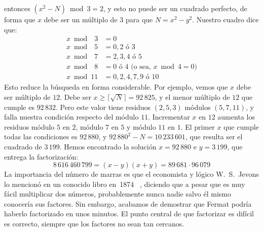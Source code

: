   entonces \((x^2 - N) \bmod 3 = 2\),
  y esto no puede ser un cuadrado perfecto,
  de forma que \(x\) debe ser un múltiplo de \(3\)
  para que \(N = x^2 - y^2\).
  Nuestro cuadro dice que:
  \begin{align*}
    x \bmod \phantom{0}3
      &= 0 \\
    x \bmod \phantom{0}5
      &= 0, 2 \text{\ ó\ } 3 \\
    x \bmod \phantom{0}7
      &= 2, 3, 4 \text{\ ó\ } 5 \\
    x \bmod \phantom{0}8
      &= 0 \text{\ ó\ } 4 \text{\ (o sea, \(x \bmod 4 = 0\))} \\
    x \bmod 11
      &= 0, 2, 4, 7, 9 \text{\ ó\ } 10
  \end{align*}
  Esto reduce la búsqueda en forma considerable.
  Por ejemplo,
  vemos que \(x\) debe ser múltiplo de \(12\).
  Debe ser \(x \ge \lceil \sqrt{N} \rceil = 92\,825\),
  y el menor múltiplo de \(12\) que cumple es \(92\,832\).
  Pero este valor
  tiene residuos \((2, 5, 3)\) módulos \((5, 7, 11)\),
  y falla nuestra condición respecto del módulo \(11\).
  Incrementar \(x\) en \(12\) aumenta los residuos
  módulo \(5\) en \(2\),
  módulo \(7\) en \(5\)
  y módulo \(11\) en \(1\).
  El primer \(x\) que cumple todas las condiciones es \(92\,880\),
  y \(92\,880^2 - N = 10\,233\,601\),
  que resulta ser el cuadrado de \(3\,199\).
  Hemos encontrado la solución \(x = 92\,880\) e \(y = 3\,199\),
  que entrega la factorización:
  \begin{equation*}
    8\,616\,460\,799 = (x - y) (x + y) = 89\,681 \cdot 96\,079
  \end{equation*}
  La importancia del número de marras
  es que el economista y lógico W.~S.~Jevons%
  lo mencionó en un conocido libro en~1874~%
    \cite{jevons74:_princ_scien},
  diciendo que a pesar que es muy fácil multiplicar dos números,
  probablemente nunca nadie salvo él mismo conocería sus factores.
  Sin embargo,
  acabamos de demostrar
  que Fermat%
  podría haberlo factorizado en unos minutos.
  El punto central de que factorizar es difícil es correcto,
  siempre que los factores no sean tan cercanos.

